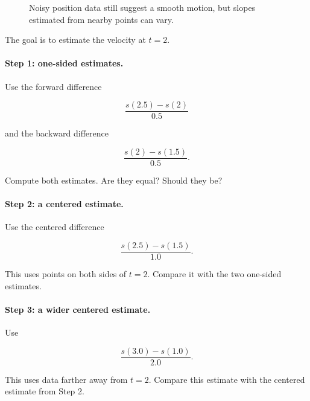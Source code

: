 \begin{figure}[h]
\centering
{}
\caption{Noisy position data still suggest a smooth motion, but slopes estimated from nearby points can vary.}
\label{fig:noisy-position-data}
\end{figure}

The goal is to estimate the velocity at \(t=2\).

\paragraph{Step 1: one-sided estimates.}
Use the forward difference

\[
\frac{s(2.5)-s(2)}{0.5}
\]

and the backward difference

\[
\frac{s(2)-s(1.5)}{0.5}.
\]

Compute both estimates.  Are they equal?  Should they be?

\paragraph{Step 2: a centered estimate.}
Use the centered difference

\[
\frac{s(2.5)-s(1.5)}{1.0}.
\]

This uses points on both sides of \(t=2\).  Compare it with the two one-sided estimates.

\paragraph{Step 3: a wider centered estimate.}
Use

\[
\frac{s(3.0)-s(1.0)}{2.0}.
\]

This uses data farther away from \(t=2\).  Compare this estimate with the centered estimate from Step 2.

